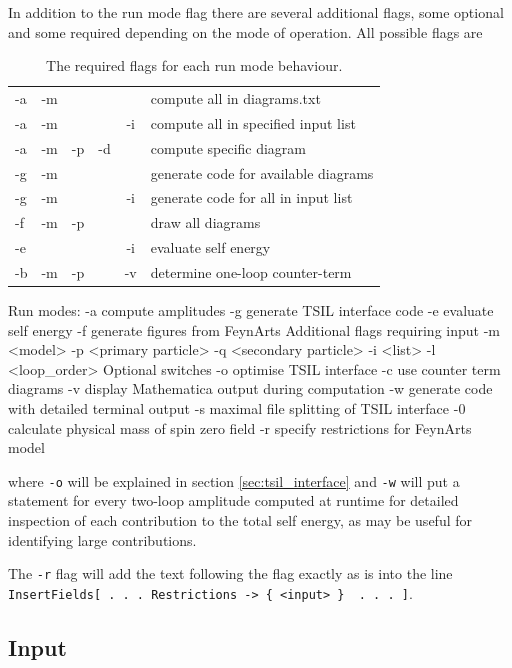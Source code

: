 In addition to the run mode flag there are several additional flags, some optional and some required depending on the mode of operation.  All possible flags are
\begin{table}
\caption{The required flags for each run mode behaviour.}
\begin{tabular}{l c c c c l} 
\hline
-a & -m & & & &compute all in diagrams.txt \\
-a & -m &  && -i&compute all in specified input list\\
-a & -m & -p & -d && compute specific diagram\\
-g & -m & & &  &generate code for available diagrams\\
-g & -m &  & & -i &generate code for all in input list\\
-f & -m & -p & & &draw all diagrams\\
-e &  & & & -i&evaluate self energy\\
-b & -m & -p & & -v&determine one-loop counter-term\\
\hline\end{tabular}
\end{table}
\begin{lstterm}
Run modes:
-a 		compute amplitudes
-g		generate TSIL interface code
-e		evaluate self energy
-f		generate figures from FeynArts
Additional flags requiring input
-m <model> 
-p <primary particle>
-q <secondary particle>
-i  <list>
-l <loop_order>
Optional switches
-o		optimise TSIL interface
-c		use counter term diagrams
-v		display Mathematica output during computation
-w		generate code with detailed terminal output
-s		maximal file splitting of TSIL interface
-0		calculate physical mass of spin zero field
-r		specify restrictions for FeynArts model
\end{lstterm}
where \lstinline{-o} will be explained in section \ref{sec:tsil_interface} and \lstinline{-w} will put a  statement for every two-loop amplitude computed at runtime for detailed inspection of each contribution to the total self energy, as may be useful for identifying large contributions.

The \lstinline{-r} flag will add the text following the flag exactly as is into the line \lstinline|InsertFields[ . . . Restrictions -> { <input> }  . . . ]|.


\subsection{Input}

